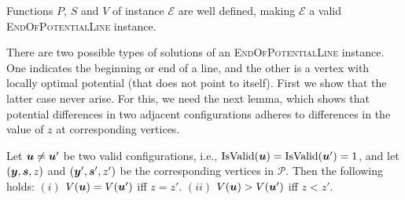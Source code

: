 \documentclass[a4paper,UKenglish]{lipics2}
\theoremstyle{definition}
\def\problem#1{\textsc{#1}}
\def\EOPL{\problem{EndOfPotentialLine}\xspace}
\def\pot{\mbox{$V$}}
\def\isvalid{\mbox{IsValid}}
\def\vert{\operatorname{\mathsf{vert}}}
\newcommand{\CPol}{\mbox{${\mathcal P}$}}
\newcommand{\CL}{\mbox{${\mathcal L}$}}
\newcommand{\CE}{\mbox{${\mathcal E}$}}
\newcommand{\yy}{\mbox{\boldmath $y$}}
\newcommand{\uu}{\mbox{\boldmath $u$}}
\newcommand{\ps}{\mbox{\boldmath $s$}}
\begin{document}
\begin{lemma}\label{lem:PSF}
Functions $P$, $S$ and $\pot$ of instance $\CE$ are well defined, making $\CE$ a valid \EOPL instance. 
\end{lemma}

There are two possible types of solutions of an \EOPL instance. One indicates
the beginning or end of a line, and the other is a vertex with locally optimal
potential (that does not point to itself). 
First we show that the latter case never arise. For this, we need the
next lemma, which shows that potential differences in two adjacent
configurations adheres to differences in the value of $z$ at corresponding
vertices.

\begin{lemma}\label{lem:pot}
Let $\uu \neq \uu'$ be two valid configurations, i.e.,
	$\isvalid(\uu)=\isvalid(\uu')=1$, and let $(\yy,\ps,z)$ and $(\yy',\ps',z')$
	be the corresponding vertices in $\CPol$. Then the following holds: $(i)$
	$\pot(\uu)=\pot(\uu')$ iff $z=z'$. $(ii)$ $\pot(\uu)>\pot(\uu')$ iff $z<z'$.
\end{lemma}
%
%
\end{document}
